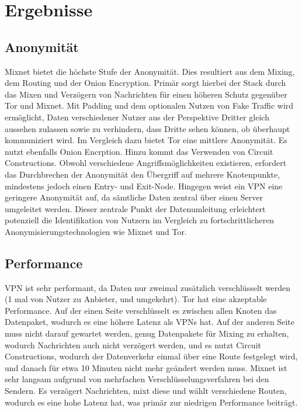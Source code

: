 \section{Ergebnisse}

\subsection{Anonymität}

Mixnet bietet die höchste Stufe der Anonymität. Dies resultiert aus dem Mixing, dem Routing und der Onion Encryption. Primär sorgt hierbei der Stack durch das Mixen und Verzögern von Nachrichten für einen höheren Schutz gegenüber Tor und Mixnet. Mit Padding und dem optionalen Nutzen von Fake Traffic wird ermöglicht, Daten verschiedener Nutzer aus der Perspektive Dritter gleich aussehen zulassen sowie zu verhindern, dass Dritte sehen können, ob überhaupt kommuniziert wird.
Im Vergleich dazu bietet Tor eine mittlere Anonymität. Es nutzt ebenfalls Onion Encrption. Hinzu kommt das Verwenden von Circuit Constructions. Obwohl verschiedene Angriffsmöglichkeiten existieren, erfordert das Durchbrechen der Anonymität den Übergriff auf mehrere Knotenpunkte, mindestens jedoch einen Entry- und Exit-Node.
Hingegen weist ein VPN eine geringere Anonymität auf, da sämtliche Daten zentral über einen Server umgeleitet werden. Dieser zentrale Punkt der Datenumleitung erleichtert potenziell die Identifikation von Nutzern im Vergleich zu fortschrittlicheren Anonymisierungstechnologien wie Mixnet und Tor.

\subsection{Performance}

VPN ist sehr performant, da Daten nur zweimal zusätzlich verschlüsselt werden (1 mal von Nutzer zu Anbieter, und umgekehrt).
Tor hat eine akzeptable Performance. Auf der einen Seite verschlüsselt es zwischen allen Knoten das Datenpaket, wodurch es eine höhere Latenz als VPNs hat. Auf der anderen Seite muss nicht darauf gewartet werden, genug Datenpakete für Mixing zu erhalten, wodurch Nachrichten auch nicht verzögert werden, und es nutzt Circuit Constructions, wodurch der Datenverkehr einmal über eine Route festgelegt wird, und danach für etwa 10 Minuten nicht mehr geändert werden muss.
Mixnet ist sehr langsam aufgrund von mehrfachen Verschlüsselungsverfahren bei den Sendern. Es verzögert Nachrichten, mixt diese und wählt verschiedene Routen, wodurch es eine hohe Latenz hat, was primär zur niedrigen Performance beiträgt.


